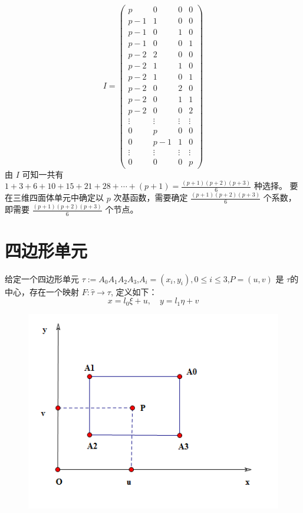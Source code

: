 \documentclass[12pt,a4paper]{article}
\begin{document}
$$
I = \begin{pmatrix}
p & 0 & 0 & 0\\
p-1 & 1 & 0 & 0\\
p-1 & 0 & 1 & 0\\
p-1 & 0 & 0 & 1\\
p-2 & 2 & 0 & 0\\
p-2 & 1 & 1 & 0\\
p-2 & 1 & 0 & 1\\
p-2 & 0 & 2 & 0 \\
p-2 & 0 & 1 & 1 \\
p-2 & 0 & 0 & 2\\
\vdots & \vdots & \vdots & \vdots \\
0   & p & 0 & 0 \\
0   & p-1 & 1 & 0\\
\vdots & \vdots & \vdots & \vdots \\
0   & 0  & 0 & p 
\end{pmatrix}
$$
由 $I$ 可知一共有 $1+3+6+10+15+21+28+\cdots+(p+1)=\frac{(p+1)(p+2)(p+3)}{6}$ 种选择。
要在三维四面体单元中确定以 $p$ 次基函数，需要确定 $\frac{(p+1)(p+2)(p+3)}{6}$ 个系数，即需要 $\frac{(p+1)(p+2)(p+3)}{6}$ 个节点。

\section{四边形单元}
给定一个四边形单元 $\tau := A_0 A_1 A_2 A_3$,$A_i=(x_i,y_i),0\leqslant i \leqslant 3$,$P=(u,v)$ 是 $\tau$的中心，存在一个映射 $F:\hat{\tau} \longrightarrow \tau$, 定义如下：
$$
x=l_0 \xi +u,\quad y=l_1 \eta +v
$$

\begin{figure}[H]
\centering
\includegraphics[scale=0.7]{./figures/5.png}
\caption{}
\end{figure}
\end{document}
